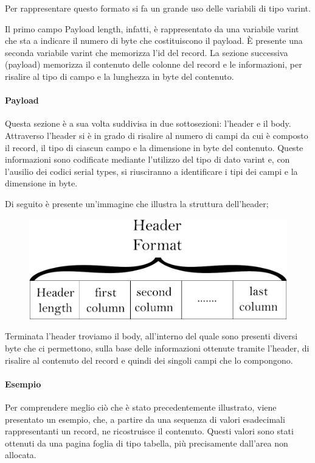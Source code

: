 Per rappresentare questo formato si fa un grande uso delle variabili di tipo varint. 

Il primo campo Payload length, infatti, è rappresentato da una variabile varint che sta a indicare il numero di byte che costituiscono il payload. È presente una seconda variabile varint che memorizza l'id del record. La sezione successiva (payload) memorizza il contenuto delle colonne del record e le informazioni, per risalire al tipo di campo e la lunghezza in byte del contenuto.


\paragraph{Payload}
Questa sezione è a sua volta suddivisa in due sottosezioni: l'header e il body.
Attraverso l'header si è in grado di risalire al numero di campi da cui è composto il record, il tipo di ciascun campo e la dimensione in byte del contenuto.
Queste informazioni sono codificate mediante l'utilizzo del tipo di dato varint e, con l'ausilio dei codici serial types, si riusciranno a identificare i tipi dei campi e la dimensione in byte.
\medskip

Di seguito è presente un'immagine che illustra la struttura dell'header;


\begin{figure}[ht]
	\centerline{\includegraphics[scale=0.25, ]{assets/record_header_format}}
	\label{fig:recordheaderformat}
\end{figure}

Terminata l'header troviamo il body, all'interno del quale sono presenti diversi byte che ci permettono, sulla base delle informazioni ottenute tramite l'header, di risalire al contenuto del record e quindi dei singoli campi che lo compongono.

\newpage

\paragraph{Esempio}
Per comprendere meglio ciò che è stato precedentemente illustrato, viene presentato un esempio, che, a partire da una sequenza di valori esadecimali rappresentanti un record, ne ricostruisce il contenuto. Questi valori sono stati ottenuti da una pagina foglia di tipo tabella, più precisamente dall'area non allocata.
\medskip


